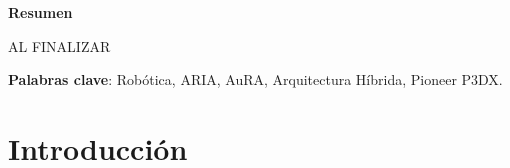 \documentclass[11pt,twoside,A5]{article}
\begin{document}
\maketitle 
\fancyhead{} 
\fancyfoot{}
\fancyfoot[RO,LE]{\thepage}

\begin{center}
{\bf\small Resumen}

\vspace{-3mm} \hspace{.05in}\parbox{4.5in} {{\small %

AL FINALIZAR

 \textbf{Palabras clave}: Robótica, ARIA, AuRA, Arquitectura Híbrida, Pioneer P3DX.}}
\end{center}
\pagebreak


%
%
%

\section*{Introducción}
\end{document}
